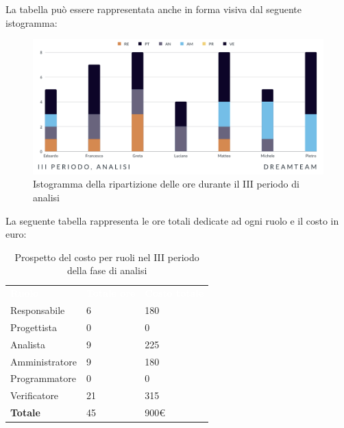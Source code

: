 La tabella può essere rappresentata anche in forma visiva dal seguente istogramma:
\begin{figure}[H]
\centering
\includegraphics[scale=0.65]{Sezioni/SezioniPreventivo/grafici/Analisi_III_periodo.png}
\caption{Istogramma della ripartizione delle ore durante il III periodo di analisi}
\end{figure}

La seguente tabella rappresenta le ore totali dedicate ad ogni ruolo e il costo in euro:

\begin{table}[H]
\begin{center}
\renewcommand{\arraystretch}{1.5}
\begin{tabular}{ m{}<{\centering}  m{}<{\centering} m{}<{\centering}}
	\rowcolor{darkblue}
	\textcolor{white}{\textbf{Ruolo}}&\textcolor{white}{\textbf{Totale ore}}&\textcolor{white}{\textbf{Costo totale}}\\ 

	Responsabile  & 6 & 180\\	
	
	Progettista & 0 & 0\\
	
	Analista & 9 &  225\\

	Amministratore & 9 & 180\\
	
	Programmatore & 0 &  0\\
	
	Verificatore & 21 &  315\\
	
	\textbf{Totale} & 45 &  900\euro \\
	
\end{tabular}
\caption{Prospetto del costo per ruoli nel III periodo della fase di analisi}
\end{center}
\end{table}

